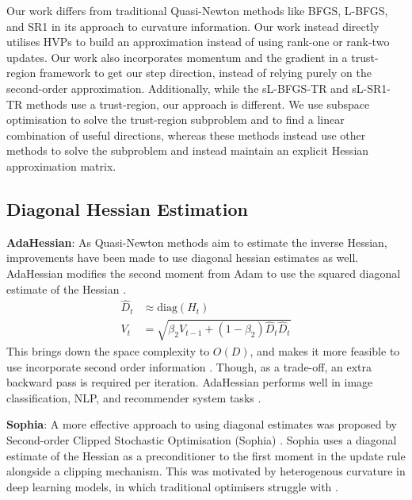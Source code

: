 Our work differs from traditional Quasi-Newton methods like BFGS, L-BFGS, and SR1 in its approach to curvature information. Our work instead directly utilises HVPs to build an approximation instead of using rank-one or rank-two updates. Our work also incorporates momentum and the gradient in a trust-region framework to get our step direction, instead of relying purely on the second-order approximation. Additionally, while the sL-BFGS-TR and sL-SR1-TR methods use a trust-region, our approach is different. We use subspace optimisation to solve the trust-region subproblem and to find a linear combination of useful directions, whereas these methods instead use other methods to solve the subproblem and instead maintain an explicit Hessian approximation matrix. 

\subsection{Diagonal Hessian Estimation} 
\label{ssec:diag_hessian}

\textbf{AdaHessian}: As Quasi-Newton methods aim to estimate the inverse Hessian, improvements have been made to use diagonal hessian estimates as well. AdaHessian modifies the second moment from Adam to use the squared diagonal estimate of the Hessian \citep{yao2021adahessian}.
\begin{align}
    \hat{D}_t &\approx \text{diag}(H_t) \\
    V_t &= \sqrt{\beta_2 V_{t-1} + (1 - \beta_2) \hat{D}_t\hat{D}_t}
\end{align}
This brings down the space complexity to $O(D)$, and makes it more feasible to use incorporate second order information \citep{yao2021adahessian}. Though, as a trade-off, an extra backward pass is required per iteration. AdaHessian performs well in image classification, NLP, and recommender system tasks \citep{yao2021adahessian}.

\textbf{Sophia}: A more effective approach to using diagonal estimates was proposed by Second-order Clipped Stochastic Optimisation (Sophia) \citep{liu2023sophia}. Sophia uses a diagonal estimate of the Hessian as a preconditioner to the first moment in the update rule alongside a clipping mechanism. This was motivated by heterogenous curvature in deep learning models, in which traditional optimisers struggle with \citep{liu2023sophia}. 

